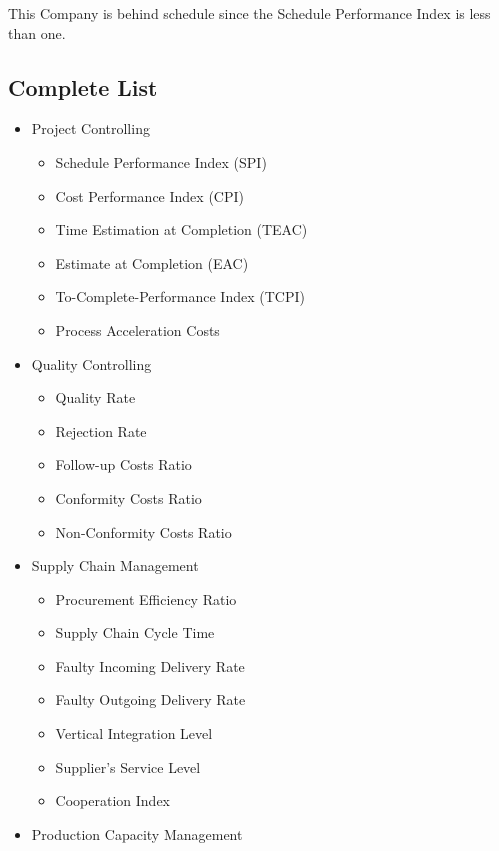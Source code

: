 \documentclass[]{book}
\providecommand{\tightlist}{%
  \setlength{\itemsep}{0pt}\setlength{\parskip}{0pt}}
\begin{document}
This Company is behind schedule since the Schedule Performance Index is
less than one.

\subsection{Complete List}\label{complete-list-2}

\begin{itemize}
\tightlist
\item
  Project Controlling

  \begin{itemize}
  \tightlist
  \item
    Schedule Performance Index (SPI)\\
  \item
    Cost Performance Index (CPI)
  \item
    Time Estimation at Completion (TEAC)
  \item
    Estimate at Completion (EAC)
  \item
    To-Complete-Performance Index (TCPI)\\
  \item
    Process Acceleration Costs
  \end{itemize}
\item
  Quality Controlling

  \begin{itemize}
  \tightlist
  \item
    Quality Rate
  \item
    Rejection Rate
  \item
    Follow-up Costs Ratio\\
  \item
    Conformity Costs Ratio\\
  \item
    Non-Conformity Costs Ratio
  \end{itemize}
\item
  Supply Chain Management

  \begin{itemize}
  \tightlist
  \item
    Procurement Efficiency Ratio\\
  \item
    Supply Chain Cycle Time\\
  \item
    Faulty Incoming Delivery Rate\\
  \item
    Faulty Outgoing Delivery Rate
  \item
    Vertical Integration Level\\
  \item
    Supplier's Service Level
  \item
    Cooperation Index
  \end{itemize}
\item
  Production Capacity Management


\end{itemize}
\end{document}
